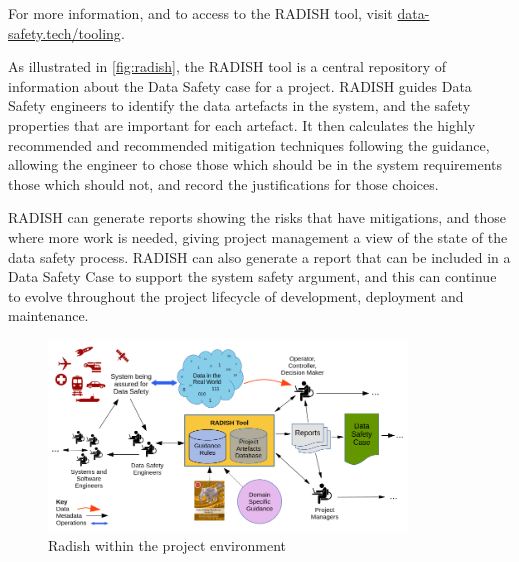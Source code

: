 For more information, and to access to the RADISH tool, visit \href{https://data-safety.tech/tooling}{data-safety.tech/tooling}.

As illustrated in \autoref{fig:radish}, the RADISH tool is a central repository of information about the Data Safety case for a project. RADISH guides Data Safety engineers to identify the data artefacts in the system, and the safety properties that are important for each artefact. It then calculates the highly recommended and recommended mitigation techniques following the guidance, allowing the engineer to chose those which should be in the system requirements those which should not, and record the justifications for those choices.

RADISH can generate reports showing the risks that have mitigations, and those where more work is needed, giving project management a view of the state of the data safety process. RADISH can also generate a report that can be included in a Data Safety Case to support the system safety argument, and this can continue to evolve throughout the project lifecycle of development, deployment and maintenance.

\begin{figure}[htbp]
  \centering
  \includegraphics[width=0.85\textwidth]{images/RADISHToolInProjectEnvironment-v02-landscape}
  \caption{Radish within the project environment}
  \label{fig:radish}
\end{figure}

